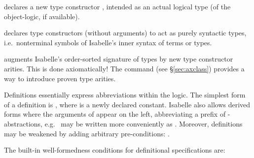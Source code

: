 \begin{isabellebody}
\begin{isamarkuptext}
\begin{descr}
  \item [\mbox{\isa{\isacommand{typedecl}}}~\isa{{\isachardoublequote}{\isacharparenleft}{\isasymalpha}\isactrlsub {\isadigit{1}}{\isacharcomma}\ {\isasymdots}{\isacharcomma}\ {\isasymalpha}\isactrlsub n{\isacharparenright}\ t{\isachardoublequote}}]
  declares a new type constructor , intended as an actual
  logical type (of the object-logic, if available).

  \item [\mbox{\isa{\isacommand{nonterminals}}}~\isa{c}] declares type
  constructors  (without arguments) to act as purely
  syntactic types, i.e.\ nonterminal symbols of Isabelle's inner
  syntax of terms or types.

  \item [\mbox{\isa{\isacommand{arities}}}~\isa{{\isachardoublequote}t\ {\isacharcolon}{\isacharcolon}\ {\isacharparenleft}s\isactrlsub {\isadigit{1}}{\isacharcomma}\ {\isasymdots}{\isacharcomma}\ s\isactrlsub n{\isacharparenright}\ s{\isachardoublequote}}] augments Isabelle's order-sorted signature of types by new type
  constructor arities.  This is done axiomatically!  The \mbox{} command (see \S\ref{sec:axclass}) provides a way to
  introduce proven type arities.

  \end{descr}%
\end{isamarkuptext}%
\isamarkuptrue%
%
\isamarkuptrue%
%
\begin{isamarkuptext}%
Definitions essentially express abbreviations within the logic.  The
  simplest form of a definition is , where  is a newly declared constant.  Isabelle also allows derived forms
  where the arguments of  appear on the left, abbreviating a
  prefix of \isa{{\isasymlambda}}-abstractions, e.g.\  may be
  written more conveniently as .  Moreover,
  definitions may be weakened by adding arbitrary pre-conditions:
  .

  \medskip The built-in well-formedness conditions for definitional
  specifications are:


\end{isamarkuptext}
\end{isabellebody}
